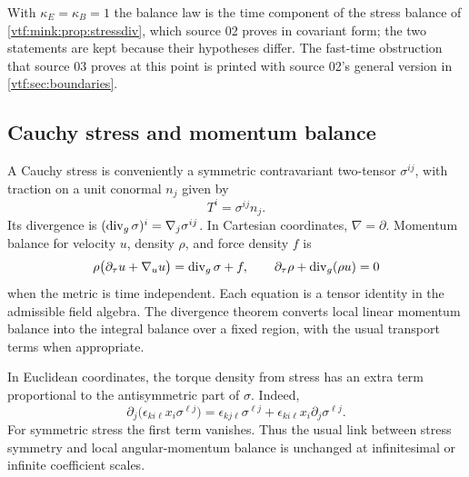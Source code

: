 \documentclass[11pt,letterpaper]{article}
\theoremstyle{definition}
\theoremstyle{remark}
\begin{document}
With $\kappa_E=\kappa_B=1$ the balance law is the time component of the stress
balance of \cref{vtf:mink:prop:stressdiv}, which source 02 proves in covariant
form; the two statements are kept because their hypotheses differ. The
fast-time obstruction that source 03 proves at this point is printed with source
02's general version in \cref{vtf:sec:boundaries}.

\subsection{Cauchy stress and momentum balance}
A Cauchy stress is conveniently a symmetric contravariant two-tensor $\sigma^{ij}$, with traction on a unit conormal $n_j$ given by
\[
 T^i=\sigma^{ij}n_j.
\]
Its divergence is $(\operatorname{div}_g\sigma)^i=\nabla_j\sigma^{ij}$. In Cartesian coordinates, $\nabla=\partial$. Momentum balance for velocity $u$, density $\rho$, and force density $f$ is
\[
 \rho\bigl(\partial_\tau u+\nabla_u u\bigr)=\operatorname{div}_g\sigma+f,
 \qquad
 \partial_\tau\rho+\operatorname{div}_g(\rho u)=0
\]
when the metric is time independent. Each equation is a tensor identity in the admissible field algebra. The divergence theorem converts local linear momentum balance into the integral balance over a fixed region, with the usual transport terms when appropriate.

In Euclidean coordinates, the torque density from stress has an extra term proportional to the antisymmetric part of $\sigma$. Indeed,
\[
 \partial_j\bigl(\epsilon_{ki\ell}x_i\sigma^{\ell j}\bigr)
 =\epsilon_{kj\ell}\sigma^{\ell j}
   +\epsilon_{ki\ell}x_i\partial_j\sigma^{\ell j}.
\]
For symmetric stress the first term vanishes. Thus the usual link between stress symmetry and local angular-momentum balance is unchanged at infinitesimal or infinite coefficient scales.
\end{document}
